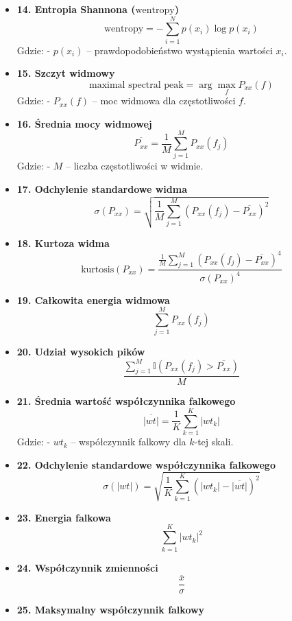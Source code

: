 \documentclass[12pt,titlepage]{article}
\begin{document}
\begin{itemize}
    \item \textbf{14. Entropia Shannona ($\text{wentropy}$)}  
    \[
    \text{wentropy} = -\sum_{i=1}^{N} p(x_i) \log p(x_i)
    \]
    Gdzie:  
    - \( p(x_i) \) – prawdopodobieństwo wystąpienia wartości \( x_i \).

    \item \textbf{15. Szczyt widmowy}  
    \[
    \text{maximal spectral peak} = \arg\max_f P_{xx}(f)
    \]
    Gdzie:  
    - \( P_{xx}(f) \) – moc widmowa dla częstotliwości \( f \).

    \item \textbf{16. Średnia mocy widmowej}  
    \[
    \overline{P_{xx}} = \frac{1}{M} \sum_{j=1}^{M} P_{xx}(f_j)
    \]
    Gdzie:  
    - \( M \) – liczba częstotliwości w widmie.

    \item \textbf{17. Odchylenie standardowe widma}  
    \[
    \sigma(P_{xx}) = \sqrt{\frac{1}{M} \sum_{j=1}^{M} (P_{xx}(f_j) - \overline{P_{xx}})^2}
    \]

    \item \textbf{18. Kurtoza widma}  
    \[
    \text{kurtosis}(P_{xx}) = \frac{\frac{1}{M} \sum_{j=1}^{M} (P_{xx}(f_j) - \overline{P_{xx}})^4}{\sigma(P_{xx})^4}
    \]

    \item \textbf{19. Całkowita energia widmowa}  
    \[
    \sum_{j=1}^{M} P_{xx}(f_j)
    \]

    \item \textbf{20. Udział wysokich pików}  
    \[
    \frac{\sum_{j=1}^{M} \mathbb{I}(P_{xx}(f_j) > \overline{P_{xx}})}{M}
    \]

    \item \textbf{21. Średnia wartość współczynnika falkowego}  
    \[
    \overline{|wt|} = \frac{1}{K} \sum_{k=1}^{K} |wt_k|
    \]
    Gdzie:  
    - \( wt_k \) – współczynnik falkowy dla \( k \)-tej skali.

    \item \textbf{22. Odchylenie standardowe współczynnika falkowego}  
    \[
    \sigma(|wt|) = \sqrt{\frac{1}{K} \sum_{k=1}^{K} (|wt_k| - \overline{|wt|})^2}
    \]

    \item \textbf{23. Energia falkowa}  
    \[
    \sum_{k=1}^{K} |wt_k|^2
    \]

    \item \textbf{24. Współczynnik zmienności}  
    \[
    \frac{\overline{x}}{\sigma}
    \]

    \item \textbf{25. Maksymalny współczynnik falkowy}  



\end{itemize}
\end{document}
